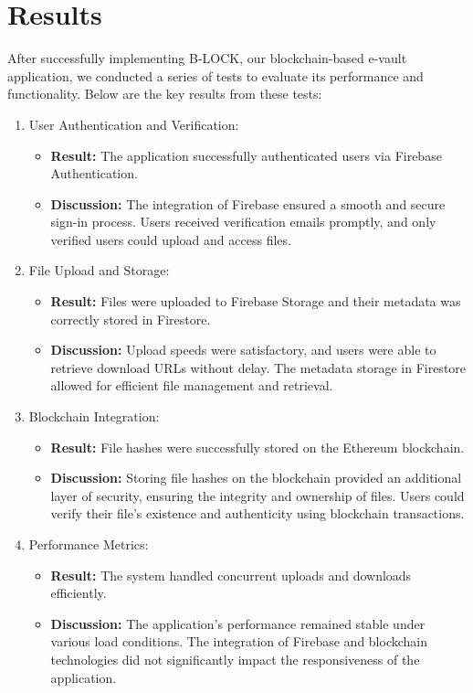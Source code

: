 \documentclass[12pt,a4paper]{report}
\begin{document}
\section{Results}
\par After successfully implementing B-LOCK, our blockchain-based e-vault application, we conducted a series of tests to evaluate its performance and functionality. Below are the key results from these tests:
\begin{enumerate}
   \item User Authentication and Verification:
   \begin{itemize}
      \item \textbf{Result:} The application successfully authenticated users via Firebase Authentication.
      \item \textbf{Discussion:} The integration of Firebase ensured a smooth and secure sign-in process. Users received verification emails promptly, and only verified users could upload and access files.
   \end{itemize}
   \item File Upload and Storage:
   \begin{itemize}
      \item \textbf{Result:} Files were uploaded to Firebase Storage and their metadata was correctly stored in Firestore.
      \item \textbf{Discussion:} Upload speeds were satisfactory, and users were able to retrieve download URLs without delay. The metadata storage in Firestore allowed for efficient file management and retrieval.
   \end{itemize}
   \item Blockchain Integration:
   \begin{itemize}
      \item \textbf{Result:} File hashes were successfully stored on the Ethereum blockchain.
      \item \textbf{Discussion:} Storing file hashes on the blockchain provided an additional layer of security, ensuring the integrity and ownership of files. Users could verify their file's existence and authenticity using blockchain transactions.
   \end{itemize}
   \item Performance Metrics:
   \begin{itemize}
      \item \textbf{Result:} The system handled concurrent uploads and downloads efficiently.
      \item \textbf{Discussion:} The application's performance remained stable under various load conditions. The integration of Firebase and blockchain technologies did not significantly impact the responsiveness of the application.
   \end{itemize}
\end{enumerate}
\end{document}
